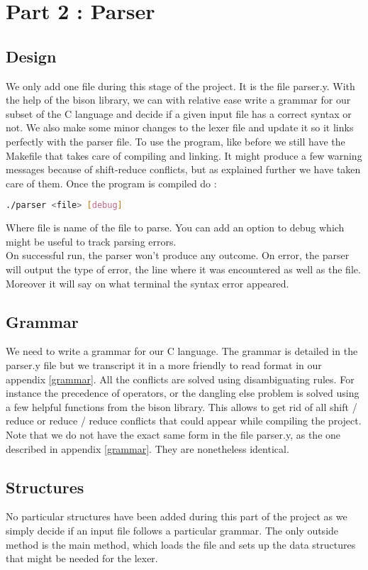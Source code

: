 \documentclass{article}
\begin{document}
\section{Part 2 : Parser}
\subsection{Design}
We only add one file during this stage of the project. It is the file parser.y. With the help of the bison library, we can with relative ease write a grammar for our subset of the C language and decide if a given input file has a correct syntax or not. We also make some minor changes to the lexer file and update it so it links perfectly with the parser file. 
To use the program, like before we still have the Makefile that takes care of compiling and linking. It might produce a few warning messages because of shift-reduce conflicts, but as explained further we have taken care of them. 
Once the program is compiled do : \begin{lstlisting}[language=bash]
./parser <file> [debug]
\end{lstlisting}
Where file is name of the file to parse. You can add an option to debug which might be useful to track parsing errors. \\
On successful run, the parser won't produce any outcome. On error, the parser will output the type of error, the line where it was encountered as well as the file. Moreover it will say on what terminal the syntax error appeared. 
\subsection{Grammar}
We need to write a grammar for our C language. The grammar is detailed in the parser.y file but we transcript it in a more friendly to read format in our appendix \ref{grammar}. All the conflicts are solved using disambiguating rules. For instance the precedence of operators, or the dangling else problem is solved using a few helpful functions from the bison library. This allows to get rid of all shift / reduce or reduce / reduce conflicts that could appear while compiling the project. 
Note that we do not have the exact same form in the file parser.y, as the one described in appendix \ref{grammar}. They are nonetheless identical.\\
\subsection{Structures}
No particular structures have been added during this part of the project as we simply decide if an input file follows a particular grammar. 
The only outside method is the main method, which loads the file and sets up the data structures that might be needed for the lexer. \\
\end{document}
